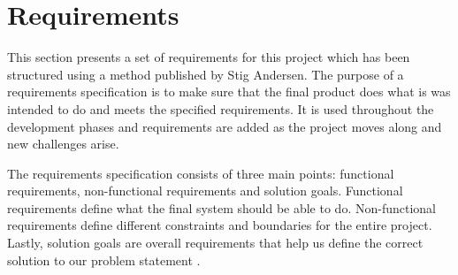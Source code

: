 \section{Requirements}
This section presents a set of requirements for this project which has been structured using a method published by Stig Andersen\cite{dengodekravspecifikation}. The purpose of a requirements specification is to make sure that the final product does what is was intended to do and meets the specified requirements. It is used throughout the development phases and requirements are added as the project moves along and new challenges arise.

The requirements specification consists of three main points: functional requirements, non-functional requirements and solution goals. Functional requirements define what the final system should be able to do. Non-functional requirements define different constraints and boundaries for the entire project. Lastly, solution goals are overall requirements that help us define the correct solution to our problem statement \cite{requirementsGuide}.


